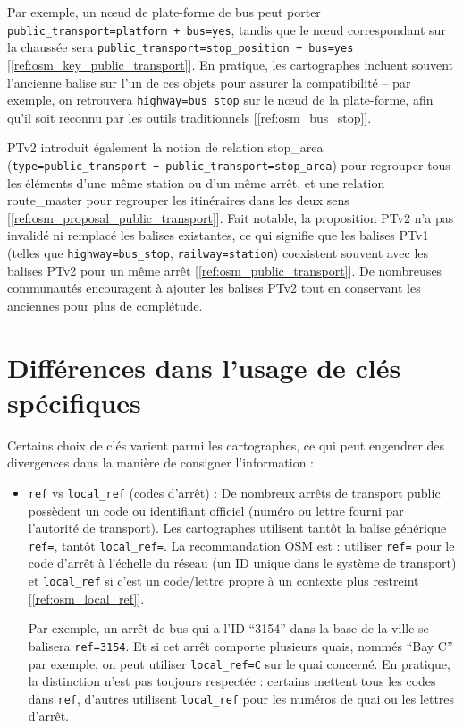 \begin{itemize}
    Par exemple, un nœud de plate-forme de bus peut porter \texttt{public\_transport=platform + bus=yes}, tandis que le nœud correspondant sur la chaussée sera \texttt{public\_transport=stop\_position + bus=yes} [\ref{ref:osm_key_public_transport}]. En pratique, les cartographes incluent souvent l’ancienne balise sur l’un de ces objets pour assurer la compatibilité – par exemple, on retrouvera \texttt{highway=bus\_stop} sur le nœud de la plate-forme, afin qu’il soit reconnu par les outils traditionnels [\ref{ref:osm_bus_stop}].
    
    PTv2 introduit également la notion de relation stop\_area (\texttt{type=public\_transport + public\_transport=stop\_area}) pour regrouper tous les éléments d’une même station ou d’un même arrêt, et une relation route\_master pour regrouper les itinéraires dans les deux sens [\ref{ref:osm_proposal_public_transport}]. Fait notable, la proposition PTv2 n’a pas invalidé ni remplacé les balises existantes, ce qui signifie que les balises PTv1 (telles que \texttt{highway=bus\_stop}, \texttt{railway=station}) coexistent souvent avec les balises PTv2 pour un même arrêt [\ref{ref:osm_public_transport}]. De nombreuses communautés encouragent à ajouter les balises PTv2 tout en conservant les anciennes pour plus de complétude.
\end{itemize}

\section{Différences dans l'usage de clés spécifiques}
Certains choix de clés varient parmi les cartographes, ce qui peut engendrer des divergences dans la manière de consigner l'information :

\begin{itemize}
    \item \texttt{ref} vs \texttt{local\_ref} (codes d'arrêt) : De nombreux arrêts de transport public possèdent un code ou identifiant officiel (numéro ou lettre fourni par l'autorité de transport). Les cartographes utilisent tantôt la balise générique \texttt{ref=}, tantôt \texttt{local\_ref=}. La recommandation OSM est : utiliser \texttt{ref=} pour le code d'arrêt à l'échelle du réseau (un ID unique dans le système de transport) et \texttt{local\_ref} si c'est un code/lettre propre à un contexte plus restreint [\ref{ref:osm_local_ref}].
    
    Par exemple, un arrêt de bus qui a l'ID ``3154'' dans la base de la ville se balisera \texttt{ref=3154}. Et si cet arrêt comporte plusieurs quais, nommés ``Bay C'' par exemple, on peut utiliser \texttt{local\_ref=C} sur le quai concerné. En pratique, la distinction n’est pas toujours respectée : certains mettent tous les codes dans \texttt{ref}, d’autres utilisent \texttt{local\_ref} pour les numéros de quai ou les lettres d’arrêt.
\end{itemize}

